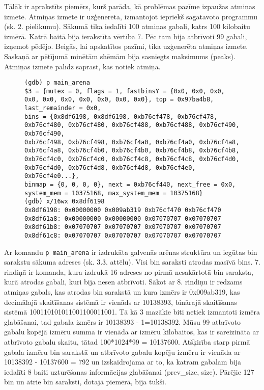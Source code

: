 Tālāk ir aprakstīts piemērs, kurš parāda, kā problēmas pazīme izpaužas atmiņas izmetē.
Atmiņas izmete ir uzģenerēta, izmantojot iepriekš sagatavoto programmu (sk. 2. pielikumu).
Sākumā tika iedalīti 100 atmiņas gabali, katrs 100 kilobaitu izmērā.
Katrā baitā bija ierakstīta vērtība 7.
Pēc tam bija atbrīvoti 99 gabali, izņemot pēdējo.
Beigās, lai apskatītos pazīmi, tika uzģenerēta atmiņas izmete.
Saskaņā ar pētījumā minētām shēmām \cite{PWMS}  bija sasniegts maksimums (peaks).
Atmiņas izmete palīdz saprast, kas notiek atmiņā.
\begin{figure}[h]
\begin{lstlisting}[style=customgdb]
(gdb) p main_arena
$3 = {mutex = 0, flags = 1, fastbinsY = {0x0, 0x0, 0x0, 0x0, 0x0, 0x0, 0x0, 0x0, 0x0, 0x0}, top = 0x97ba4b8, last_remainder = 0x0,
bins = {0x8df6198, 0x8df6198, 0xb76cf478, 0xb76cf478, 0xb76cf480, 0xb76cf480, 0xb76cf488, 0xb76cf488, 0xb76cf490, 0xb76cf490,
0xb76cf498, 0xb76cf498, 0xb76cf4a0, 0xb76cf4a0, 0xb76cf4a8, 0xb76cf4a8, 0xb76cf4b0, 0xb76cf4b0, 0xb76cf4b8, 0xb76cf4b8,
0xb76cf4c0, 0xb76cf4c0, 0xb76cf4c8, 0xb76cf4c8, 0xb76cf4d0, 0xb76cf4d0, 0xb76cf4d8, 0xb76cf4d8, 0xb76cf4e0, 0xb76cf4e0...},
binmap = {0, 0, 0, 0}, next = 0xb76cf440, next_free = 0x0, system_mem = 10375168, max_system_mem = 10375168}
(gdb) x/16wx 0x8df6198
0x8df6198: 0x00000000 0x009ab319 0xb76cf470 0xb76cf470
0x8df61a8: 0x00000000 0x00000000 0x07070707 0x07070707
0x8df61b8: 0x07070707 0x07070707 0x07070707 0x07070707
0x8df61c8: 0x07070707 0x07070707 0x07070707 0x07070707
\end{lstlisting}
\caption{\textbf{\fontsize{11}{12}\selectfont {bin saraksta izdruka, izmantojot atmiņas izmeti}}}
\end{figure}
Ar komandu \texttt{p main\_arena} ir izdrukāta galvenās arēnas struktūra un iegūtas bin sarakstu sākuma adreses (sk. 3.3. attēlu).
Visi bin saraksti atrodas masīvā bins.
7. rindiņā ir komanda, kura izdrukā 16 adreses no pirmā nesakārtotā bin saraksta, kurā atrodas gabali, kuri bija nesen atbrīvoti.
Sākot ar 8. rindiņu ir redzams atmiņas gabals, kas atrodas bin sarakstā un kura izmērs ir 0x009ab319, kas decimālajā skaitīšanas sistēmā ir vienāds ar 10138393, binārajā skaitīšanas sistēmā 100110101011001100011001.
Tā kā 3 mazākie biti netiek izmantoti izmēra glabāšanai, tad gabala izmērs ir 10138393 - 1=10138392.
Mūsu 99 atbrīvoto gabalu kopējā izmēru summa ir vienāda ar izmēru kilobaitos, kas ir sareizināta ar atbrīvoto gabalu skaitu, tātad 100*1024*99 = 10137600.
Atšķirība starp pirmā gabala izmēru bin sarakstā un atbrīvoto gabalu kopēju izmēru ir vienāda ar 10138392 - 10137600 = 792 un izskaidrojama ar to, ka katram gabalam bija iedalīti 8 baiti uzturēšanas informācijas glabāšanai (prev\_size, size).
Pārējie 127 bin un ātrie bin saraksti, dotajā piemērā, bija tukši.

